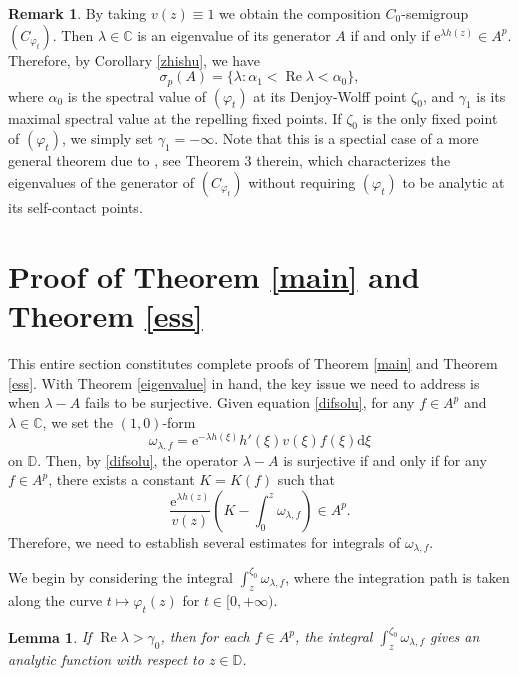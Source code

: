 \documentclass{amsart}
\theoremstyle{proclaim}
\newtheorem{lemma}[theorem]{Lemma}
\theoremstyle{fancyproclaim}
\theoremstyle{definition}
\newtheorem{remark}[theorem]{Remark}
\theoremstyle{fancystatement}
\numberwithin{equation}{section}
\begin{document}
\begin{remark}\label{2yue25}
By taking $v(z)\equiv1$ we obtain the composition $C_0$-semigroup $(C_{\varphi_t})$. Then $\lambda\in\mathbb{C}$ is an eigenvalue of its generator $A$ if and only if $\mathrm{e}^{\lambda h(z)}\in A^p$. Therefore, by Corollary \ref{zhishu}, we have
$$\sigma_p(A)=\{\lambda : \alpha_1<\operatorname{Re}\lambda<\alpha_0\},$$
where $\alpha_0$ is the spectral value of $(\varphi_t)$ at its Denjoy-Wolff point $\zeta_0$, and $\gamma_1$ is its maximal spectral value at the repelling fixed points. If $\zeta_0$ is the only fixed point of $(\varphi_t)$, we simply set $\gamma_1=-\infty.$ Note that this is a spectial case of a more general theorem due to \cite{tezheng2}, see Theorem 3 therein, which characterizes the eigenvalues of the generator of $(C_{\varphi_t})$ without requiring $(\varphi_t)$ to be analytic at its self-contact points.
\end{remark}








\section{Proof of Theorem \ref{main} and Theorem \ref{ess}}\label{sec6}

This entire section constitutes complete proofs of Theorem \ref{main} and Theorem \ref{ess}.  With Theorem \ref{eigenvalue} in hand, the key issue we need to address is when $\lambda-A$ fails to be surjective. Given equation \eqref{difsolu}, for any  $f\in A^p$ and $\lambda\in\mathbb{C}$, we set the $(1,0)$-form
$$\omega_{\lambda,f}= \mathrm{e}^{-\lambda h(\xi)}h'(\xi)v(\xi)f(\xi) \mathrm{d}\xi$$
on $\mathbb{D}$. Then, by \eqref{difsolu}, the operator $\lambda-A$ is surjective if and only if for any  $f\in A^p$, there exists a constant $K=K(f)$ such that
$$\frac{ \mathrm{e}^{\lambda h(z)}}{v(z)}\left(K-\int_0^z\omega_{\lambda,f}\right)\in A^p.$$
Therefore, we need to establish several estimates for integrals of $\omega_{\lambda,f}$.

We begin by considering the integral $\int_z^{\zeta_0}\omega_{\lambda,f}$, where the integration path is taken along the curve $t\mapsto\varphi_t(z)$ for $t\in[0,+\infty)$.

\begin{lemma}\label{jifenshoulian}
If $ \operatorname{Re}\lambda>\gamma_0$, then for each $f\in A^p$, the integral $\int_z^{\zeta_0}\omega_{\lambda,f}$ gives an analytic function with respect to $z\in\mathbb{D}$.
\end{lemma}
\end{document}
